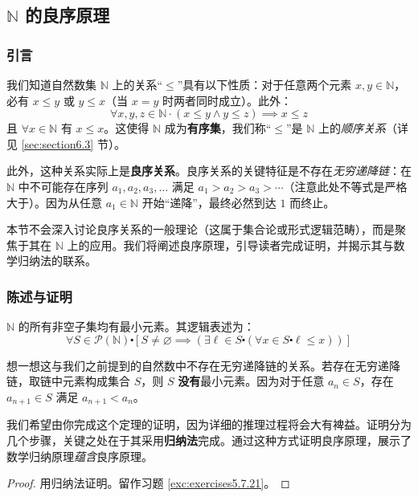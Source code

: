 \subsection{$\mathbb{N}$ 的良序原理} \label{sec:section5.5.2}

\subsubsection*{引言}

我们知道自然数集 $\mathbb{N}$ 上的关系``$\le$''具有以下性质：对于任意两个元素 $x, y \in \mathbb{N}$，必有 $x \le y$ 或 $y \le x$（当 $x = y$ 时两者同时成立）。此外：
\[\forall x, y, z \in \mathbb{N} \cdot (x \le y \land y \le z) \implies x \le z\]
且 $\forall x \in \mathbb{N}$ 有 $x \le x$。这使得 $\mathbb{N}$ 成为\textbf{有序集}，我们称``$\le$''是 $\mathbb{N}$ 上的\emph{顺序关系}（详见 \ref{sec:section6.3} 节）。

此外，这种关系实际上是\textbf{良序关系}。良序关系的关键特征是不存在\emph{无穷递降链}：在 $\mathbb{N}$ 中不可能存在序列 $a_1, a_2, a_3, \dots$ 满足 $a_1 > a_2 > a_3 > \cdots$（注意此处不等式是严格大于）。因为从任意 $a_1 \in \mathbb{N}$ 开始``递降''，最终必然到达 $1$ 而终止。

本节不会深入讨论良序关系的一般理论（这属于集合论或形式逻辑范畴），而是聚焦于其在 $\mathbb{N}$ 上的应用。我们将阐述良序原理，引导读者完成证明，并揭示其与数学归纳法的联系。

\subsubsection*{陈述与证明}

\begin{theorem}\label{theorem5.5.2}
    $\mathbb{N}$ 的所有非空子集均有最小元素。其逻辑表述为：
    \[\forall S \in \mathcal{P}(\mathbb{N}) \centerdot [S \ne \varnothing \implies (\exists \ell \in S \centerdot (\forall x \in S \centerdot \ell \le x))]\]
\end{theorem}

想一想这与我们之前提到的自然数中不存在无穷递降链的关系。若存在无穷递降链，取链中元素构成集合 $S$，则 $S$ \textbf{没有}最小元素。因为对于任意 $a_n \in S$，存在 $a_{n+1} \in S$ 满足 $a_{n+1} < a_n$。

我们希望由你完成这个定理的证明，因为详细的推理过程将会大有裨益。证明分为几个步骤，关键之处在于其采用\textbf{归纳法}完成。通过这种方式证明良序原理，展示了数学归纳原理\emph{蕴含}良序原理。

\begin{proof}
    用归纳法证明。留作习题 \ref{exc:exercises5.7.21}。
\end{proof}

